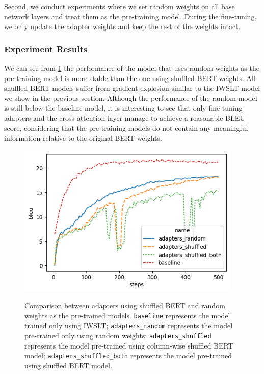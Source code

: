 Second, we conduct experiments where we set random weights on all base network layers and treat them as the pre-training model. During the fine-tuning, we only update the adapter weights and keep the rest of the weights intact.

\subsubsection{Experiment Results}
We can see from \cref{img:shfrndcmp} the performance of the model that uses random weights as the pre-training model is more stable than the one using shuffled BERT weights. All shuffled BERT models suffer from gradient explosion similar to the IWSLT model we show in the previous section. Although the performance of the random model is still below the baseline model, it is interesting to see that only fine-tuning adapters and the cross-attention layer manage to achieve a reasonable BLEU score, considering that the pre-training models do not contain any meaningful information relative to the original BERT weights.
\begin{figure}[h]
    {\includegraphics[width=0.95\textwidth]{img/randomshuffled.png}}
    \centering
    \caption[Comparison between adapters using shuffled BERT and random weights as the pre-trained models.]{Comparison between adapters using shuffled BERT and random weights as the pre-trained models. \texttt{baseline} represents the model trained only using IWSLT; \texttt{adapters\_random} represents the model pre-trained only using random weights; \texttt{adapters\_shuffled} represents the model pre-trained using column-wise shuffled BERT model; \texttt{adapters\_shuffled\_both} represents the model pre-trained using shuffled BERT model.}
    \label{img:shfrndcmp}
\end{figure}

